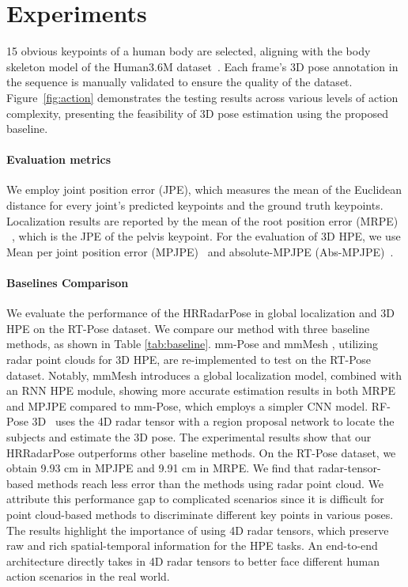 
\section{Experiments} 
15 obvious keypoints of a human body are selected, aligning with the body skeleton model of the Human3.6M dataset~\cite{ionescu2013human3}. 
Each frame's 3D pose annotation in the sequence is manually validated to ensure the quality of the dataset. Figure~\ref{fig:action} demonstrates the testing results across various levels of action complexity, presenting the feasibility of 3D pose estimation using the proposed baseline.

\paragraph{Evaluation metrics}
We employ joint position error (JPE), which measures the mean of the Euclidean distance for every joint's predicted keypoints and the ground truth keypoints. Localization results are reported by the mean of the root position error (MRPE) ~\cite{wang2021deep}, which is the JPE of the pelvis keypoint. For the evaluation of 3D HPE, we use Mean per joint position error (MPJPE)~\cite{zheng2023deep} and absolute-MPJPE (Abs-MPJPE)~\cite{veges2019absolute}.

\paragraph{Baselines Comparison}
We evaluate the performance of the HRRadarPose in global localization and 3D HPE on the RT-Pose dataset. 
We compare our method with three baseline methods, as shown in Table \ref{tab:baseline}. mm-Pose \cite{sengupta2020mm} and mmMesh \cite{xue2021mmmesh}, utilizing radar point clouds for 3D HPE, are re-implemented to test on the RT-Pose dataset. 
Notably, mmMesh introduces a global localization model, combined with an RNN HPE module, showing more accurate estimation results in both MRPE and MPJPE compared to mm-Pose, which employs a simpler CNN model. RF-Pose 3D~\cite{zhao2018rf} uses the 4D radar tensor with a region proposal network to locate the subjects and estimate the 3D pose. 
The experimental results show that our HRRadarPose outperforms other baseline methods. On the RT-Pose dataset, we obtain  9.93 cm in MPJPE and 9.91 cm in MRPE. We find that radar-tensor-based methods reach less error than the methods using radar point cloud. 
We attribute this performance gap to complicated scenarios since it is difficult for point cloud-based methods to discriminate different key points in various poses. 
The results highlight the importance of using 4D radar tensors, which preserve raw and rich spatial-temporal information for the HPE tasks. 
An end-to-end architecture directly takes in 4D radar tensors to better face different human action scenarios in the real world.


